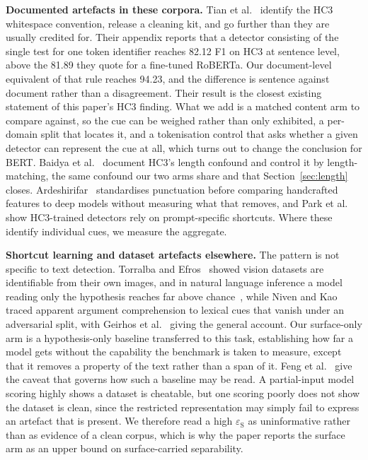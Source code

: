 \textbf{Documented artefacts in these corpora.} Tian et al.~\cite{Tian2023multiscale} identify the HC3 whitespace convention, release a cleaning kit, and go further than they are usually credited for. Their appendix reports that a detector consisting of the single test for one token identifier reaches 82.12 F1 on HC3 at sentence level, above the 81.89 they quote for a fine-tuned RoBERTa. Our document-level equivalent of that rule reaches 94.23, and the difference is sentence against document rather than a disagreement. Their result is the closest existing statement of this paper's HC3 finding. What we add is a matched content arm to compare against, so the cue can be weighed rather than only exhibited, a per-domain split that locates it, and a tokenisation control that asks whether a given detector can represent the cue at all, which turns out to change the conclusion for BERT. Baidya et al.~\cite{Baidya2026detecting} document HC3's length confound and control it by length-matching, the same confound our two arms share and that Section~\ref{sec:length} closes. Ardeshirifar~\cite{Ardeshirifar2025comparing} standardises punctuation before comparing handcrafted features to deep models without measuring what that removes, and Park et al.~\cite{Park2024investigating} show HC3-trained detectors rely on prompt-specific shortcuts. Where these identify individual cues, we measure the aggregate.

\textbf{Shortcut learning and dataset artefacts elsewhere.} The pattern is not specific to text detection. Torralba and Efros~\cite{Torralba2011unbiased} showed vision datasets are identifiable from their own images, and in natural language inference a model reading only the hypothesis reaches far above chance~\cite{Gururangan2018annotation,Poliak2018hypothesis}, while Niven and Kao~\cite{Niven2019probing} traced apparent argument comprehension to lexical cues that vanish under an adversarial split, with Geirhos et al.~\cite{Geirhos2020shortcut} giving the general account. Our surface-only arm is a hypothesis-only baseline transferred to this task, establishing how far a model gets without the capability the benchmark is taken to measure, except that it removes a property of the text rather than a span of it. Feng et al.~\cite{Feng2019misleading} give the caveat that governs how such a baseline may be read. A partial-input model scoring highly shows a dataset is cheatable, but one scoring poorly does not show the dataset is clean, since the restricted representation may simply fail to express an artefact that is present. We therefore read a high $\varepsilon_{\mathrm{S}}$ as uninformative rather than as evidence of a clean corpus, which is why the paper reports the surface arm as an upper bound on surface-carried separability.

